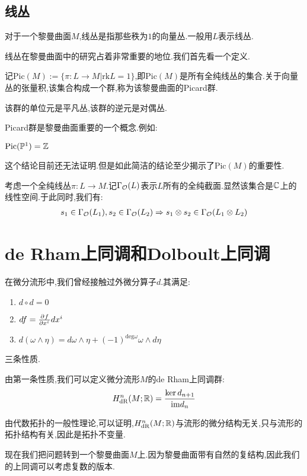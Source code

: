 \subsection*{线丛}
对于一个黎曼曲面$M$,线丛是指那些秩为$1$的向量丛.一般用$L$表示线丛.

线丛在黎曼曲面中的研究占着非常重要的地位.我们首先看一个定义.
\begin{definition}
	记$\mathrm{Pic}(M):=\{\pi:L \to M|\mathrm{rk}L=1\}$,即$\mathrm{Pic}(M)$是所有全纯线丛的集合.关于向量丛的张量积,该集合构成一个群,称为该黎曼曲面的Picard群.

	该群的单位元是平凡丛,该群的逆元是对偶丛.
\end{definition}

Picard群是黎曼曲面重要的一个概念.例如:
\begin{example}
	$\mathrm{Pic}(\mathbb{P}^1)=\mathbb{Z}$
\end{example}
这个结论目前还无法证明.但是如此简洁的结论至少揭示了$\mathrm{Pic}(M)$的重要性.

考虑一个全纯线丛$\pi:L \to M$.记$\Gamma_{\mathcal{O}}(L)$表示$L$所有的全纯截面.显然该集合是$\mathbb{C}$上的线性空间.于此同时,我们有:
\begin{align*}
	s_1 \in \Gamma_{\mathcal{O}}(L_1),s_2 \in \Gamma_{\mathcal{O}}(L_2) \Rightarrow s_1\otimes s_2 \in \Gamma_{\mathcal{O}}(L_1\otimes L_2)
\end{align*}


\section{de Rham上同调和Dolboult上同调}
在微分流形中,我们曾经接触过外微分算子$d$.其满足:
\begin{enumerate}
	\item $d \circ d=0$
	\item $df=\frac{\partial^{} f}{\partial {x^i}^{}}dx^i$
	\item $d(\omega \wedge \eta)=d\omega \wedge \eta+(-1)^{\mathrm{deg}\omega}\omega \wedge d\eta$
\end{enumerate}
三条性质.

由第一条性质,我们可以定义微分流形$M$的de Rham上同调群:
\begin{align*}
	H_{\mathrm{dR}}^n(M;\mathbb{R})=\frac{\ker d_{n+1}}{\mathrm{im}d_n}
\end{align*}

由代数拓扑的一般性理论,可以证明,$H_{\mathrm{dR}}^n(M;\mathbb{R})$与流形的微分结构无关,只与流形的拓扑结构有关,因此是拓扑不变量.

现在我们把问题转到一个黎曼曲面$M$上.因为黎曼曲面带有自然的复结构,因此我们的上同调可以考虑复数的版本.
